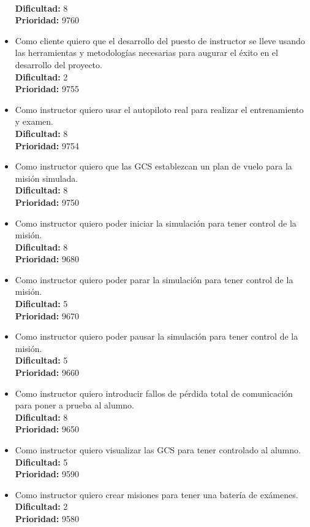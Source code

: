 \documentclass[12pt,a4paper,spanish]{book} %
\begin{document}
\begin{itemize}
\\
\textbf{Dificultad: }8
\\
\textbf{Prioridad: }9760
\item Como cliente quiero que el desarrollo del puesto de instructor se lleve usando las herramientas y metodologías necesarias para augurar el éxito en el desarrollo del proyecto.
\\
\textbf{Dificultad: }2
\\
\textbf{Prioridad: }9755
\item Como instructor quiero usar el autopiloto real para realizar el entrenamiento y examen.
\\
\textbf{Dificultad: }8
\\
\textbf{Prioridad: }9754
\item Como instructor quiero que las GCS establezcan un plan de vuelo para la misión simulada.
\\
\textbf{Dificultad: }8
\\
\textbf{Prioridad: }9750
\item Como instructor quiero poder iniciar la simulación para tener control de la misión.
\\
\textbf{Dificultad: }8
\\
\textbf{Prioridad: }9680
\item Como instructor quiero poder parar la simulación para tener control de la misión.
\\
\textbf{Dificultad: }5
\\
\textbf{Prioridad: }9670
\item Como instructor quiero poder pausar la simulación para tener control de la misión.
\\
\textbf{Dificultad: }5
\\
\textbf{Prioridad: }9660
\item Como instructor quiero introducir fallos de pérdida total de comunicación para poner a prueba al alumno.
\\
\textbf{Dificultad: }8
\\
\textbf{Prioridad: }9650
\item Como instructor quiero visualizar las GCS para tener controlado al alumno.
\\
\textbf{Dificultad: }5
\\
\textbf{Prioridad: }9590
\item Como instructor quiero crear misiones para tener una batería de exámenes.
\\
\textbf{Dificultad: }2
\\
\textbf{Prioridad: }9580

\end{itemize}
\end{document}
